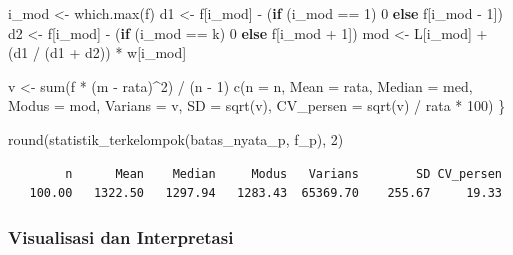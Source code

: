 \documentclass[
  indonesian,
  letterpaper,
]{book}
\newenvironment{Shaded}{\begin{snugshade}}{\end{snugshade}}
\newcommand{\AttributeTok}[1]{\textcolor[rgb]{0.40,0.45,0.13}{#1}}
\newcommand{\ControlFlowTok}[1]{\textcolor[rgb]{0.00,0.23,0.31}{\textbf{#1}}}
\newcommand{\DecValTok}[1]{\textcolor[rgb]{0.68,0.00,0.00}{#1}}
\newcommand{\FunctionTok}[1]{\textcolor[rgb]{0.28,0.35,0.67}{#1}}
\newcommand{\NormalTok}[1]{\textcolor[rgb]{0.00,0.23,0.31}{#1}}
\newcommand{\OtherTok}[1]{\textcolor[rgb]{0.00,0.23,0.31}{#1}}
\newcommand{\SpecialCharTok}[1]{\textcolor[rgb]{0.37,0.37,0.37}{#1}}
\begin{document}
\begin{Shaded}
\begin{Highlighting}[]
\NormalTok{i\_mod }\OtherTok{\textless{}{-}} \FunctionTok{which.max}\NormalTok{(f)}
\NormalTok{d1 }\OtherTok{\textless{}{-}}\NormalTok{ f[i\_mod] }\SpecialCharTok{{-}}\NormalTok{ (}\ControlFlowTok{if}\NormalTok{ (i\_mod }\SpecialCharTok{==} \DecValTok{1}\NormalTok{) }\DecValTok{0} \ControlFlowTok{else}\NormalTok{ f[i\_mod }\SpecialCharTok{{-}} \DecValTok{1}\NormalTok{])}
\NormalTok{d2 }\OtherTok{\textless{}{-}}\NormalTok{ f[i\_mod] }\SpecialCharTok{{-}}\NormalTok{ (}\ControlFlowTok{if}\NormalTok{ (i\_mod }\SpecialCharTok{==}\NormalTok{ k) }\DecValTok{0} \ControlFlowTok{else}\NormalTok{ f[i\_mod }\SpecialCharTok{+} \DecValTok{1}\NormalTok{])}
\NormalTok{mod }\OtherTok{\textless{}{-}}\NormalTok{ L[i\_mod] }\SpecialCharTok{+}\NormalTok{ (d1 }\SpecialCharTok{/}\NormalTok{ (d1 }\SpecialCharTok{+}\NormalTok{ d2)) }\SpecialCharTok{*}\NormalTok{ w[i\_mod]}

\NormalTok{v }\OtherTok{\textless{}{-}} \FunctionTok{sum}\NormalTok{(f }\SpecialCharTok{*}\NormalTok{ (m }\SpecialCharTok{{-}}\NormalTok{ rata)}\SpecialCharTok{\^{}}\DecValTok{2}\NormalTok{) }\SpecialCharTok{/}\NormalTok{ (n }\SpecialCharTok{{-}} \DecValTok{1}\NormalTok{)}
\FunctionTok{c}\NormalTok{(}\AttributeTok{n =}\NormalTok{ n, }\AttributeTok{Mean =}\NormalTok{ rata, }\AttributeTok{Median =}\NormalTok{ med, }\AttributeTok{Modus =}\NormalTok{ mod,}
\AttributeTok{Varians =}\NormalTok{ v, }\AttributeTok{SD =} \FunctionTok{sqrt}\NormalTok{(v), }\AttributeTok{CV\_persen =} \FunctionTok{sqrt}\NormalTok{(v) }\SpecialCharTok{/}\NormalTok{ rata }\SpecialCharTok{*} \DecValTok{100}\NormalTok{)}
\NormalTok{\}}

\FunctionTok{round}\NormalTok{(}\FunctionTok{statistik\_terkelompok}\NormalTok{(batas\_nyata\_p, f\_p), }\DecValTok{2}\NormalTok{)}
\end{Highlighting}
\end{Shaded}

\begin{verbatim}
        n      Mean    Median     Modus   Varians        SD CV_persen 
   100.00   1322.50   1297.94   1283.43  65369.70    255.67     19.33 
\end{verbatim}

\subsubsection{Visualisasi dan
Interpretasi}\label{visualisasi-dan-interpretasi}
\end{document}
